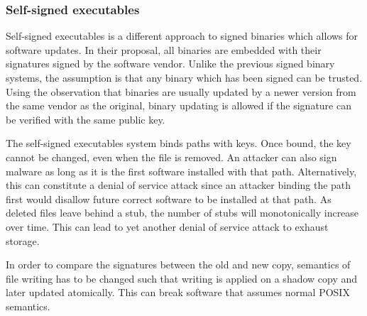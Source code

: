 \subsubsection{Self-signed executables}

Self-signed executables \cite{selfsign} is a different approach
to signed binaries which allows for software updates.
In their proposal, all binaries are embedded with their signatures signed
by the software vendor.
Unlike the previous signed binary systems, the assumption is that any
binary which has been signed can be trusted.
Using the observation that binaries are usually updated by a newer
version from the same vendor as the original,
binary updating is allowed if the signature can be verified
with the same public key.

The self-signed executables system binds paths with keys.
Once bound, the key cannot be changed, even when the file is removed.
An attacker can also sign malware as long as it is the first
software installed with that path.
Alternatively, this can constitute a denial of service attack since
an attacker binding the path first would disallow future correct
software to be installed at that path.
As deleted files leave behind a stub, the number of stubs will
monotonically increase over time. This can lead to yet another
denial of service attack to exhaust storage.

In order to compare the signatures between the old and new copy,
semantics of file writing has to be changed such that
writing is applied on a shadow copy and later updated atomically.
This can break software that assumes normal POSIX semantics.
